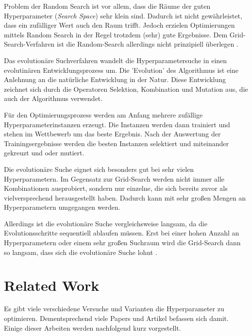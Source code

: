 Problem der Random Search ist vor allem, dass die Räume der guten Hyperparameter (\textit{Search Space}) sehr klein sind.
Dadurch ist nicht gewährleistet, dass ein zufälliger Wert auch den Raum trifft.
Jedoch erzielen Optimierungen mittels Random Search in der Regel trotzdem (sehr) gute Ergebnisse.
Dem Grid-Search-Verfahren ist die Random-Search allerdings nicht prinzipiell überlegen \cite{hyperparameters-random-search}.

Das evolutionäre Suchverfahren wandelt die Hyperparametersuche in einen evolutinären Entwicklungsprozess um.
Die 'Evolution' des Algorithmus ist eine Anlehnung an die natürliche Entwicklung in der Natur.
Diese Entwicklung zeichnet sich durch die Operatoren Selektion, Kombination und Mutation aus, die auch der Algorithmus verwendet. \cite{hyperparameters-search-comparison-focus-genetic, hyperparameters-genetic-algorithm}
\newline

Für den Optimierungsprozess werden am Anfang mehrere zufällige Hyperparameterinstanzen erzeugt.
Die Instanzen werden dann trainiert und stehen im Wettbewerb um das beste Ergebnis.
Nach der Auswertung der Trainingsergebnisse werden die besten Instanzen selektiert und miteinander gekreuzt und oder mutiert.
\newline

Die evolutionäre Suche eignet sich besonders gut bei sehr vielen Hyperparametern.
Im Gegensatz zur Grid-Search werden nicht immer alle Kombinationen ausprobiert, sondern nur einzelne, die sich bereits zuvor als vielversprechend herausgestellt haben.
Dadurch kann mit sehr großen Mengen an Hyperparametern umgegangen werden.

Allerdings ist die evolutionäre Suche vergleichsweise langsam, da die Evolutionsschritte sequentiell ablaufen müssen.
Erst bei einer hohen Anzahl an Hyperparametern oder einem sehr großen Suchraum wird die Grid-Search dann so langsam, dass sich die evolutionäre Suche lohnt \cite{hyperparameters-search-comparison-focus-genetic}.

\section{Related Work}
\label{chapter:related-work}
Es gibt viele verschiedene Versuche und Varianten die Hyperparameter zu optimieren.
Dementsprechend viele Papers und Artikel befassen sich damit.
Einige dieser Arbeiten werden nachfolgend kurz vorgestellt.
\newline

